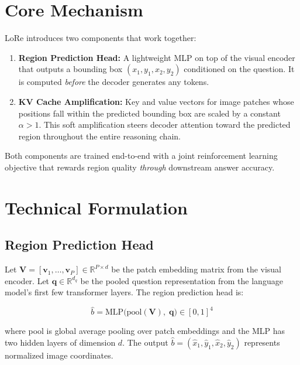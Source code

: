 \documentclass[10pt,twocolumn]{article}
\begin{document}
\section{Core Mechanism}

LoRe introduces two components that work together:

\begin{enumerate}[leftmargin=1.5em,itemsep=2pt]
  \item \textbf{Region Prediction Head:} A lightweight MLP on top of the visual encoder that outputs a bounding box $(x_1,y_1,x_2,y_2)$ conditioned on the question.
    It is computed \emph{before} the decoder generates any tokens.
  \item \textbf{KV Cache Amplification:} Key and value vectors for image patches whose positions fall within the predicted bounding box are scaled by a constant $\alpha > 1$.
    This soft amplification steers decoder attention toward the predicted region throughout the entire reasoning chain.
\end{enumerate}

Both components are trained end-to-end with a joint reinforcement learning objective that rewards region quality \emph{through} downstream answer accuracy.

\section{Technical Formulation}

\subsection*{Region Prediction Head}

Let $\mathbf{V} = [\mathbf{v}_1, \ldots, \mathbf{v}_P] \in \mathbb{R}^{P \times d}$ be the patch embedding matrix from the visual encoder.
Let $\mathbf{q} \in \mathbb{R}^{d_q}$ be the pooled question representation from the language model's first few transformer layers.
The region prediction head is:

\begin{equation}
\hat{b} = \mathrm{MLP}\bigl(\mathrm{pool}(\mathbf{V}),\; \mathbf{q}\bigr) \in [0,1]^4
\end{equation}

where pool is global average pooling over patch embeddings and the MLP has two hidden layers of dimension $d$.
The output $\hat{b} = (\hat{x}_1, \hat{y}_1, \hat{x}_2, \hat{y}_2)$ represents normalized image coordinates.
\end{document}
